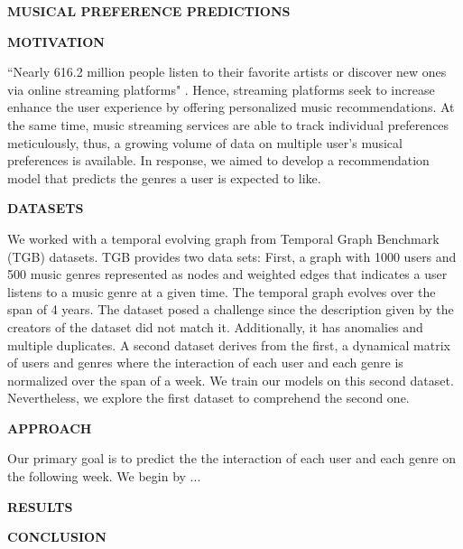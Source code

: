 \documentclass[10pt, letterpaper]{article}
\renewcommand{\title}[1]{%
	\begin{center}
		{\Large \bfseries \uppercase{#1}}
	\end{center}
}
\renewcommand{\section}[1]{%
	    \vspace{\parskip}
		{\large \bfseries\uppercase{#1}}
}
\begin{document}
	
\title{Musical preference predictions}

\section{Motivation}

``Nearly 616.2 million people listen to their favorite artists or discover new ones via online streaming platforms" \cite{statista}. Hence, streaming platforms seek to increase enhance the user experience by offering personalized music recommendations. At the same time, music streaming services are able to track individual preferences meticulously, thus, a growing volume of data on  multiple user's musical preferences is available.
In response, we aimed to develop a recommendation model that predicts the genres a user is expected to like.

\section{Datasets}

We worked with a temporal evolving graph from Temporal Graph Benchmark (TGB) \cite{H:2023} datasets. TGB provides two data sets: First, a graph with 1000 users and 500 music genres represented as nodes and weighted edges that indicates a user listens to a music genre at a given time. The temporal graph evolves over the span of 4 years. The dataset posed a challenge since the description given by the creators of the dataset did not match it. Additionally, it has anomalies and multiple duplicates. A second dataset derives from the first, a dynamical matrix of users and genres where the interaction of each user and each genre is normalized over the span of a week. We train our models on this second dataset. Nevertheless, we explore the first dataset to comprehend the second one.

\section{Approach}

Our primary goal is to predict the the interaction of each user and each genre on the following week. We begin by ...

\section{Results}

\section{Conclusion}
\end{document}
